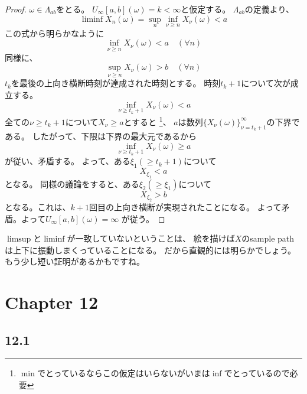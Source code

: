       \begin{proof}
        $\omega \in \Lambda_{ab}$をとる。
        $U_{\infty}[a,b](\omega) = k < \infty$と仮定する。
        $\Lambda_{ab}$の定義より、
        \[\liminf X_n(\omega) = \sup_{n}\inf_{\nu \ge n}X_{\nu}(\omega) < a\]
        この式から明らかなように
        \[\inf_{\nu \ge n}X_{\nu}(\omega) < a \quad (\forall n)\]
        同様に、
        \[\sup_{\nu \ge n}X_{\nu}(\omega) > b \quad (\forall n)\]
        $t_k$を最後の上向き横断時刻が達成された時刻とする。
        時刻$t_k + 1$について次が成立する。
        \[\inf_{\nu \ge t_k + 1}X_{\nu}(\omega) < a\]
        全ての$\nu \ge t_k + 1$について$X_{\nu} \ge a$とすると
        \footnote{$\min$でとっているならこの仮定はいらないがいまは$\inf$でとっているので必要}、
        $a$は数列$\{X_{\nu}(\omega)\}_{\nu = t_k +1}^{\infty}$の下界である。
        したがって、下限は下界の最大元であるから
        \[\inf_{\nu \ge t_k + 1}X_{\nu}(\omega) \ge a\]
        が従い、矛盾する。
        よって、ある$\xi_1 (\ge t_k + 1)$について
        \[X_{\xi_1} < a\]
        となる。
        同様の議論をすると、ある$\xi_2 (\ge \xi_1)$について
        \[X_{\xi_2} > b\]
        となる。これは、$k+1$回目の上向き横断が実現されたことになる。
        よって矛盾。よって$U_{\infty}[a,b](\omega) = \infty$
        が従う。
      \end{proof}
      \begin{rem*}
        $\limsup$と$\liminf$が一致していないということは、
        絵を描けば$X$のsample pathは上下に振動しまくっていることになる。
        だから直観的には明らかでしょう。
        もう少し短い証明があるかもですね。
      \end{rem*}

\section{Chapter 12}
  \subsection{12.1}
